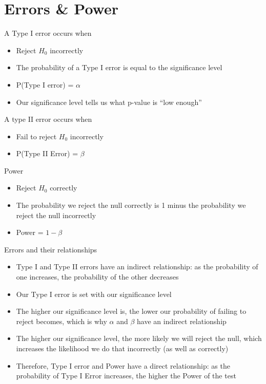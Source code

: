 \documentclass[../stats.tex]{subfiles}
\begin{document}
\section{Errors \& Power}
A Type I error occurs when 
\begin{itemize}
    \item Reject $H_0$ incorrectly 
    \item The probability of a Type I error is equal to the significance level 
    \item P(Type I error) = $\alpha$
    \item Our significance level tells us what p-value is ``low enough''
\end{itemize}

A type II error occurs when 
\begin{itemize}
    \item Fail to reject $H_0$ incorrectly 
    \item P(Type II Error) = $\beta$
\end{itemize}

Power 
\begin{itemize}
    \item Reject $H_0$ correctly 
    \item The probability we reject the null correctly is 1 minus the probability we reject the null incorrectly
    \item Power = $1-\beta$
\end{itemize}

Errors and their relationships 
\begin{itemize}
    \item Type I and Type II errors have an indirect relationship: as the probability of one increases, the probability of the other decreases 
    \item Our Type I error is set with our significance level 
    \item The higher our significance level is, the lower our probability of failing to reject becomes, which is why $\alpha$ and $\beta$ have an indirect relationship 
    \item The higher our significance level, the more likely we will reject the null, which increases the likelihood we do that incorrectly (as well as correctly)
    \item Therefore, Type I error and Power have a direct relationship: as the probability of Type I Error increases, the higher the Power of the test 
\end{itemize}
\end{document}
